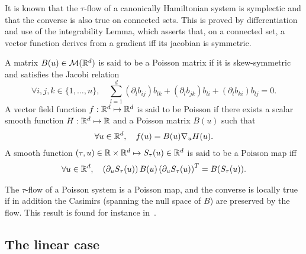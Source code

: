 \begin{remark}
  It is known that the $\tau$-flow of a canonically Hamiltonian system
  is symplectic and that the converse is also true on connected sets.
  This is proved by differentiation and use of the integrability Lemma,
  which asserts that, on a connected set, a vector function derives from
  a gradient iff its jacobian is symmetric.
\end{remark}


\begin{definition}
  A matrix $B(u) \in {\cal M}(\mathbb{R}^{d})$ is said to be a Poisson matrix if
  it is skew-symmetric and satisfies the Jacobi relation
  $$
  \forall i,j,k \in \{1,\ldots,n\}, \quad \sum_{l=1}^d (\partial_l b_{ij}) b_{lk} +(\partial_l b_{jk}) b_{li}+(\partial_l b_{ki}) b_{lj} = 0. 
  $$
  A vector field function $f:\mathbb{R}^{d} \mapsto \mathbb{R}^{d}$ is said to be Poisson
  if there exists a scalar smooth function $H:\mathbb{R}^{d} \mapsto \mathbb{R}$ and a
  Poisson matrix $B(u)$ such that 
  \begin{align*}
    \forall u \in \mathbb{R}^{d}, \quad f(u) = B(u) \nabla_u H(u).
  \end{align*}
  A smooth function $(\tau,u) \in \mathbb{R} \times \mathbb{R}^{d} \mapsto  S_\tau(u) \in
  \mathbb{R}^{d}$ is said to be a Poisson map  iff
  \begin{align*}
    \forall u \in \mathbb{R}^{d}, \quad \left(\partial_u S_\tau(u)\right) B(u) \left(\partial_u S_\tau(u)\right)^T = B(S_\tau(u)).
  \end{align*}
\end{definition}

\begin{remark} \label{sec:geometry:rmk:equiv_poisson} The $\tau$-flow of a
  Poisson system is a Poisson map, and the converse is locally
  true if in addition the Casimirs (spanning the null space of $B$) are
  preserved by the flow. This result is found for instance in~\cite[Chap.
  VII, Thm. 4.5]{hairer.2006.geometric}. 
\end{remark}



\subsection{The linear case}


